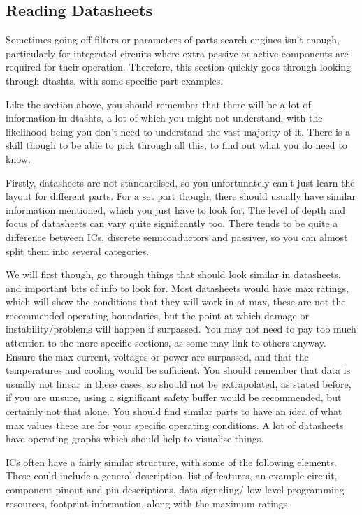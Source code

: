 \documentclass[a4paper,11pt]{report}
\begin{document}
\vspace*{1\baselineskip}

\subsection{Reading Datasheets}

Sometimes going off filters or parameters of parts search engines isn't enough, particularly for integrated circuits where extra passive or active components are required for their operation. Therefore, this section quickly goes through looking through \gls{dtasht}s, with some specific part examples.

Like the section above, you should remember that there will be a lot of information in \gls{dtasht}s, a lot of which you might not understand, with the likelihood being you don't need to understand the vast majority of it. There is a skill though to be able to pick through all this, to find out what you do need to know.

Firstly, datasheets are not standardised, so you unfortunately can't just learn the layout for different parts. For a set part though, there should usually have similar information mentioned, which you just have to look for. The level of depth and focus of datasheets can vary quite significantly too. There tends to be quite a difference between ICs, discrete semiconductors and passives, so you can almost split them into several categories.

We will first though, go through things that should look similar in datasheets, and important bits of info to look for. Most datasheets would have max ratings, which will show the conditions that they will work in at max, these are not the recommended operating boundaries, but the point at which damage or instability/problems will happen if surpassed. You may not need to pay too much attention to the more specific sections, as some may link to others anyway. Ensure the max current, voltages or power are surpassed, and that the temperatures and cooling would be sufficient. You should remember that data is usually not linear in these cases, so should not be extrapolated, as stated before, if you are unsure, using a significant safety buffer would be recommended, but certainly not that alone. You should find similar parts to have an idea of what max values there are for your specific operating conditions. A lot of datasheets have operating graphs which should help to visualise things.

ICs often have a fairly similar structure, with some of the following elements. These could include a general description, list of features, an example circuit, component pinout and pin descriptions, data signaling/ low level programming resources, footprint information, along with the maximum ratings.
\end{document}
